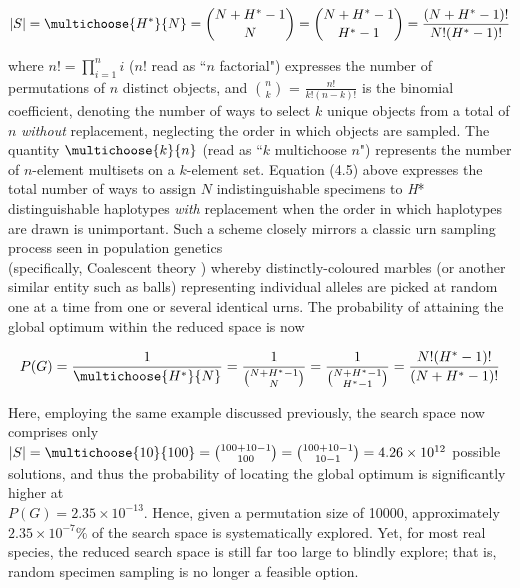 \begin{equation}
|S| = \multichoose{H^*}{N} = {{N + H^* - 1}\choose{N}} = {{N + H^* - 1}\choose{H^* - 1}} = \frac{(N + H^* - 1)!}{N!(H^* - 1)!}
\end{equation}

\noindent where $n! = \prod_{i=1}^n{i}$ ($n!$ read as ``$n$ factorial") expresses the number of permutations of $n$ distinct objects, and ${n}\choose{k}$ = $\frac{n!}{k!(n-k)!}$ is the binomial coefficient, denoting the number of ways to select $k$ unique objects from a total of $n$ \textit{without} replacement, neglecting the order in which objects are sampled. The quantity $\multichoose{k}{n}$ (read as ``$k$ multichoose $n$") represents the number of $n$-element multisets on a $k$-element set. Equation (4.5) above expresses the total number of ways to assign $N$ indistinguishable specimens to \textit{H}* distinguishable haplotypes \textit{with} replacement when the order in which haplotypes are drawn is unimportant. Such a scheme closely mirrors a classic urn sampling process seen in population genetics \\ (specifically, Coalescent theory \cite{kingman1982coalescent}) whereby distinctly-coloured marbles (or another similar entity such as balls) representing individual alleles are picked at random one at a time from one or several identical urns. The probability of attaining the global optimum within the reduced space is now

\begin{equation}
P(G) = \frac{1}{\multichoose{H^*}{N}} = \frac{1}{{{N + H^* - 1}\choose{N}}} = \frac{1}{{{N + H^* - 1}\choose{H^* - 1}}} = \frac{N!(H^* - 1)!}{(N + H^* - 1)!}
\end{equation}

\noindent Here, employing the same example discussed previously, the search space now comprises only $|S| = \multichoose{10}{100} = {{100 + 10 - 1}\choose{100}} = {{100 + 10 - 1}\choose{10 - 1}} = 4.26 \times 10^{12}$ possible solutions, and thus the probability of locating the global optimum is significantly higher at \\ $P(G) = 2.35 \times 10^{-13}$. Hence, given a permutation size of 10000, approximately \\ $2.35 \times 10^{-7}\%$ of the search space is systematically explored. Yet, for most real species, the reduced search space is still far too large to blindly explore; that is, random specimen sampling is no longer a feasible option.




